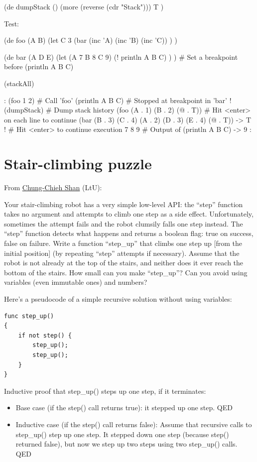 \begin{wideverbatim}

(de dumpStack ()
   (more (reverse (cdr "Stack")))
   T )

Test:

(de foo (A B)
   (let C 3
      (bar (inc 'A) (inc 'B) (inc 'C)) ) )

(de bar (A D E)
   (let (A 7  B 8  C 9)
      (! println A B C) ) )  # Set a breakpoint before (println A B C)

(stackAll)

: (foo 1 2)  # Call 'foo'
(println A B C)  # Stopped at breakpoint in 'bar'
! (dumpStack)  # Dump stack history
(foo (A . 1) (B . 2) (@ . T))  # Hit <enter> on each line to continue
(bar (B . 3) (C . 4) (A . 2) (D . 3) (E . 4) (@ . T))
-> T
!  # Hit <enter> to continue execution
7 8 9  # Output of (println A B C)
-> 9
:

\end{wideverbatim}

\pagebreak{}
\section*{Stair-climbing puzzle}

From \href{http://lambda-the-ultimate.org/node/1872}{Chung-Chieh Shan}
(LtU):

Your stair-climbing robot has a very simple low-level API: the ``step''
function takes no argument and attempts to climb one step as a side
effect. Unfortunately, sometimes the attempt fails and the robot
clumsily falls one step instead. The ``step'' function detects what
happens and returns a boolean flag: true on success, false on failure.
Write a function ``step\_up'' that climbs one step up {[}from the
initial position{]} (by repeating ``step'' attempts if necessary).
Assume that the robot is not already at the top of the stairs, and
neither does it ever reach the bottom of the stairs. How small can you
make ``step\_up''? Can you avoid using variables (even immutable ones)
and numbers?

Here's a pseudocode of a simple recursive solution without using
variables:

\begin{verbatim}
func step_up()
{
    if not step() {
        step_up();
        step_up();
    }
}
\end{verbatim}

Inductive proof that step\_up() steps up one step, if it terminates:

\begin{itemize}
\item
  Base case (if the step() call returns true): it stepped up one step.
  QED
\item
  Inductive case (if the step() call returns false): Assume that
  recursive calls to step\_up() step up one step. It stepped down one
  step (because step() returned false), but now we step up two steps
  using two step\_up() calls. QED
\end{itemize}

